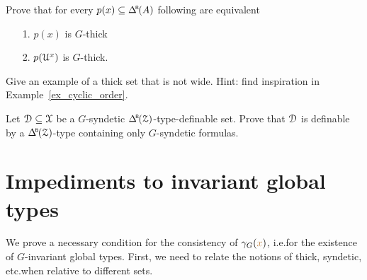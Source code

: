 \begin{exercise}\label{ex_thick_types}
  Prove that for every $p(x)\subseteq \BDelta(A)$ following are equivalent
  \begin{itemize}
    \item[1.] $p(x)$ is $G$-thick
    \item[2.] $p(\EuScript U^x)$ is $G$-thick.
  \end{itemize}
\end{exercise}

\begin{exercise}
  Give an example of a thick set that is not wide.
  Hint: find inspiration in Example~\ref{ex_cyclic_order}.
\end{exercise}

\begin{exercise}\label{ex_syndetic_type_vs_formulas}
  Let $\EuScript D\subseteq\EuScript X$ be a $G$-syndetic $\BDelta(\Z)$-type-definable set.
  Prove that $\EuScript D$ is definable by a $\BDelta(\Z)$-type containing only $G$-syndetic formulas.
\end{exercise}



\section{Impediments to invariant global types}

We prove a necessary condition for the consistency of $\gamma_G({\color{brown} x})$, i.e.\@ for the existence of $G$-invariant global types.
First, we need to relate the notions of thick, syndetic, etc.\@ when relative to different sets.

